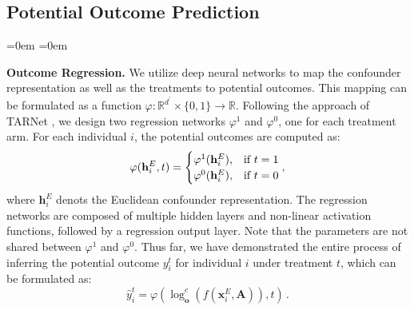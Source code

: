 \documentclass[twoside,leqno,twocolumn]{article}
\begin{document}
\vspace{-0.8em}
\subsection{Potential Outcome Prediction} \label{sec4.4}
\begin{list}{}{\leftmargin=0em \itemindent=0em \topsep=0pt \parsep=0pt \itemsep=2pt}
\item \textbf{Outcome Regression.}
We utilize deep neural networks to map the confounder representation as well as the treatments to potential outcomes. This mapping can be formulated as a function $\varphi: \mathbb{R}^{d^\prime} \times \{0,1\} \rightarrow \mathbb{R}$. 
Following the approach of TARNet \cite{shalit2017estimating}, we design two regression networks $\varphi^1$ and $\varphi^0$, one for each treatment arm. 
For each individual $i$, the potential outcomes are computed as:
\begin{equation}
\vspace{-0.3em}
\label{eq12}
    \begin{aligned} 
    \varphi({\mathbf{h}_i^E, t}) 
    &= \begin{cases} 
    \varphi^1({\mathbf{h}_i^E}), &\text{if } t=1 \\ 
    \varphi^0({\mathbf{h}_i^E}), &\text{if } t=0
    \end{cases} \\
    \end{aligned} \,,
\end{equation} 
where $\mathbf{h}_i^E$ denots the Euclidean confounder representation. The regression networks are composed of multiple hidden layers and non-linear activation functions, followed by a regression output layer. Note that the parameters are not shared between $\varphi^1$ and $\varphi^0$.
Thus far, we have demonstrated the entire process of inferring the potential outcome $y_i^{t}$ for individual $i$ under treatment $t$, which can be formulated as:
\begin{equation}
\label{eq13}
    \hat{y}_i^{t} =  \varphi({\log_{\mathbf{o}}^c(f(\mathbf{x}_i^E, \mathbf{A})), t}) \,.
\end{equation}


\end{list}
\end{document}
